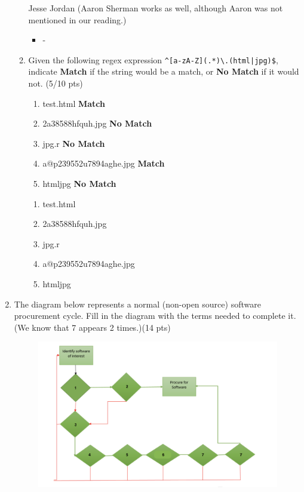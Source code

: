\documentclass[10pt]{article}
\begin{document}
\begin{enumerate}
\begin{enumerate}
	\beginanswers
	\bigskip
	Jesse Jordan
	(Aaron Sherman works as well, although Aaron was not mentioned in our reading.)
	\bigskip
	\else
	\begin{itemize}
		\bigskip
		\bigskip
		\item  - 
		\bigskip
		\bigskip
	\end{itemize}
	\fi
	\item Given the following regex expression \verb+^[a-zA-Z](.*)\.(html|jpg)$+, indicate \textbf{Match} if the string would be a match, or \textbf{No Match} if it would not. (5/10 pts)
	\beginanswers
		\begin{enumerate}[1]
		\bigskip
		\item test.html  \textbf{Match}
		\bigskip
		\bigskip
		\bigskip
		\item 2a38588hfquh.jpg  \textbf{No Match}
		\bigskip
		\bigskip
		\bigskip
		\item jpg.r  \textbf{No Match}
		\bigskip
		\bigskip
		\bigskip
		\item a@p239552u7894aghe.jpg  \textbf{Match}
		\bigskip
		\bigskip
		\bigskip
		\item htmljpg \textbf{No Match}
		\bigskip
		\bigskip
		\bigskip
		\end{enumerate}
	\else
		\begin{enumerate}[1]
		\bigskip
		\item test.html
		\bigskip
		\bigskip
		\bigskip
		\item 2a38588hfquh.jpg
		\bigskip
		\bigskip
		\bigskip
		\item jpg.r
		\bigskip
		\bigskip
		\bigskip
		\item a@p239552u7894aghe.jpg
		\bigskip
		\bigskip
		\bigskip
		\item htmljpg
		\bigskip
		\bigskip
		\bigskip
		\end{enumerate}
		\fi
	
	\end{enumerate}

 \newpage

	\item The diagram below represents a normal (non-open source) software procurement cycle. Fill in the diagram with the terms needed to complete it. (We know that 7 appears 2 times.)(14 pts)
	
	\begin{figure}[h]
		\centering
		\includegraphics[width=.9\linewidth]{images/diag1.png}
		\label{fig:licensing}
	\end{figure}


\end{enumerate}
\end{document}
